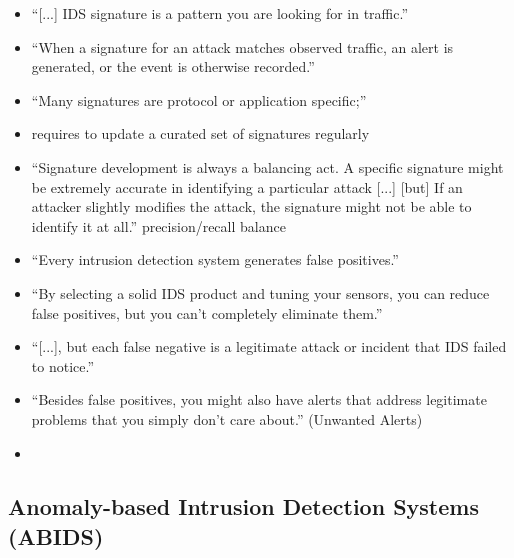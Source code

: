 		\begin{itemize}
			\item \enquote{[...] IDS signature is a pattern you are looking for in traffic.} \parencite{Northcutt2005}
			\item \enquote{When a signature for an attack matches observed traffic, an alert is generated, or the event is otherwise recorded.} \parencite{Northcutt2005}
			\item \enquote{Many signatures are protocol or application specific;} \parencite{Northcutt2005}
			\item requires to update a curated set of signatures regularly \parencite{Northcutt2005}
			\item \enquote{Signature development is always a balancing act. A specific signature might be extremely accurate in identifying a particular attack [...] [but] If an attacker slightly modifies the attack, the signature might not be able to identify it at all.} \parencite{Northcutt2005}
				\subitem precision/recall balance
			\item \enquote{Every intrusion detection system generates false positives.} \parencite[p.~205]{Northcutt2005}
			\item \enquote{By selecting a solid IDS product and tuning your sensors, you can reduce false positives, but you can't completely eliminate them.} \parencite[p.~205]{Northcutt2005}
			\item \enquote{[...], but each false negative is a legitimate attack or incident that IDS failed to notice.} \parencite[p.~206]{Northcutt2005}
			\item \enquote{Besides false positives, you might also have alerts that address legitimate problems that you simply don't care about.} (Unwanted Alerts) \parencite[p.~206]{Northcutt2005}
			\item 
		\end{itemize} 
	
	\subsection{Anomaly-based Intrusion Detection Systems (ABIDS)}
	\label{sec:background:network:ids:anomaly}
	
